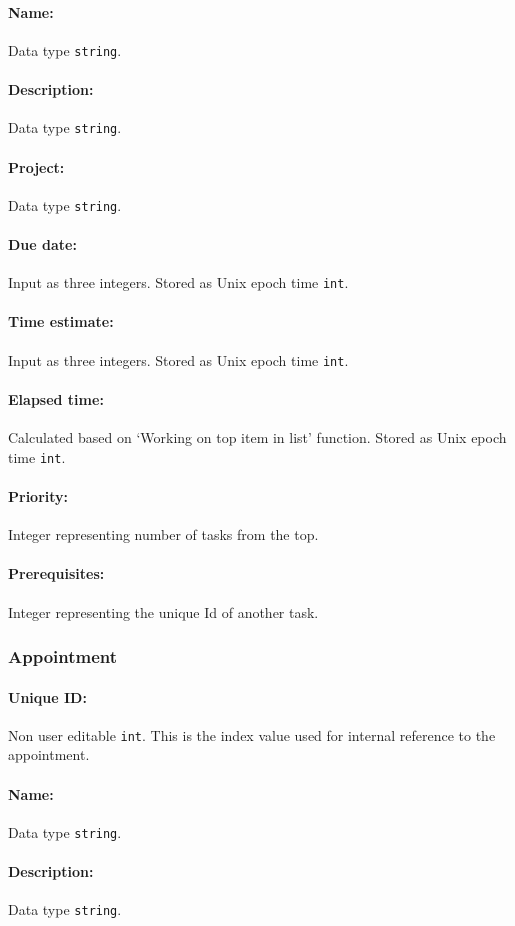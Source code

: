 \documentclass[12pt]{article}
\newcommand{\e}[1] {{\tt #1}}
\begin{document}
\paragraph{Name:} Data type \e{string}.
\paragraph{Description:} Data type \e{string}.
\paragraph{Project:} Data type \e{string}.
\paragraph{Due date:} Input as three integers. Stored as Unix epoch time \e{int}.
\paragraph{Time estimate:} Input as three integers. Stored as Unix epoch time \e{int}.
\paragraph{Elapsed time:} Calculated based on `Working on top item in list' function. Stored as Unix epoch time \e{int}. 
\paragraph{Priority:} Integer representing number of tasks from the top.
\paragraph{Prerequisites:} Integer representing the unique Id of another task.

\subsubsection{Appointment} \label{sec:Appointment}
\paragraph{Unique ID:} Non user editable \e{int}. This is the index value used for internal reference to the appointment. 
\paragraph{Name:} Data type \e{string}.
\paragraph{Description:} Data type \e{string}.
\end{document}

